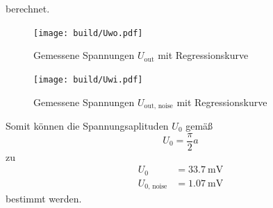 berechnet.
\begin{figure}
    \centering
    \caption{Gemessene Spannungen $U_\text{out}$ mit Regressionskurve}
    \label{fig:Uwo}
    \texttt{[image: build/Uwo.pdf]}
\end{figure}
\begin{figure}
    \centering
    \caption{Gemessene Spannungen $U_\text{out, noise}$ mit Regressionskurve}
    \label{fig:Uwi}
    \texttt{[image: build/Uwi.pdf]}
\end{figure}
Somit können die Spannungsaplituden $U_0$ gemäß
\begin{equation*}
    U_0 = \frac{\pi}{2} a
\end{equation*}
zu 
\begin{align*}
    U_0                 & = \SI{33.7}{\milli\volt} \\
    U_{0 \text{, noise}}& = \SI{1.07}{\milli\volt}
\end{align*}
bestimmt werden.
\FloatBarrier
